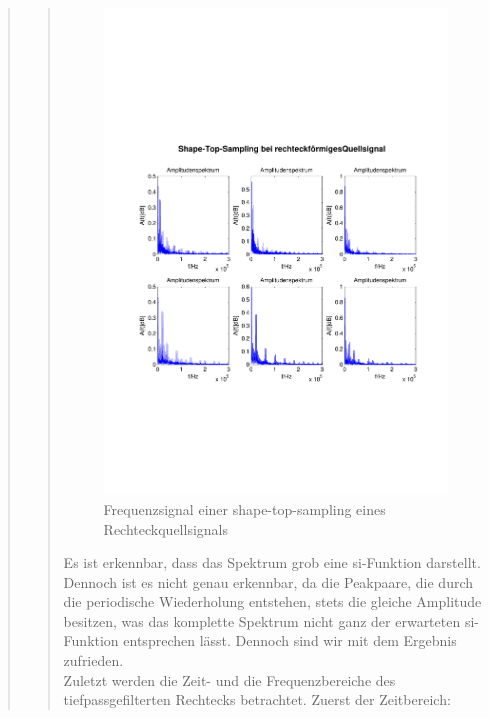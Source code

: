 \begin{quote}
\begin{quote}
        	
        	\begin{figure}[H]
            \centering
            \includegraphics[scale=0.6, trim = 1.5cm 6cm 1cm 8cm,
            clip]{./Bilder/shape-top-recht_freq}
                \caption{Frequenzsignal einer shape-top-sampling eines Rechteckquellsignals}
      	    \end{figure}
      	    
        	Es ist erkennbar, dass das Spektrum grob eine si-Funktion darstellt.
			Dennoch ist es nicht genau erkennbar, da die Peakpaare, die durch die
			periodische Wiederholung entstehen, stets die gleiche Amplitude besitzen, was
			das komplette Spektrum nicht ganz der erwarteten si-Funktion entsprechen
			lässt. Dennoch sind wir mit dem Ergebnis zufrieden.\\
        
        
        	Zuletzt werden die Zeit- und die Frequenzbereiche des tiefpassgefilterten
        	Rechtecks betrachtet. Zuerst der Zeitbereich:
        	

\end{quote}
\end{quote}
